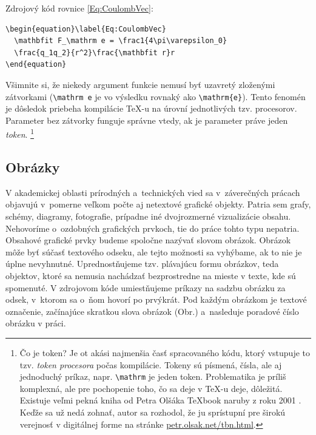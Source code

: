 Zdrojový kód rovnice \eqref{Eq:CoulombVec}:
\begin{verbatim}
\begin{equation}\label{Eq:CoulombVec}
  \mathbfit F_\mathrm e = \frac1{4\pi\varepsilon_0}
  \frac{q_1q_2}{r^2}\frac{\mathbfit r}r
\end{equation}
\end{verbatim}
Všimnite si, že niekedy argument funkcie nemusí byť
uzavretý zloženými zátvorkami (\verb|\mathrm e| je vo výsledku rovnaký ako \verb|\mathrm{e}|).
Tento fenomén je dôsledok priebeha kompilácie \TeX-u na úrovní jednotlivých tzv. procesorov.
Parameter bez zátvorky funguje správne vtedy,
ak je parameter práve jeden \emph{token}.%
\footnote{Čo je token? Je ot akási najmenšia časť spracovaného
kódu, ktorý vstupuje to tzv. \emph{token procesora}
počas kompilácie.
Tokeny sú písmená, čísla, ale aj jednoduchý príkaz, 
napr. \texttt{\textbackslash mathrm} je jeden token. 
Problematika je príliš komplexná, ale pre pochopenie
toho, čo sa deje v \TeX-u deje, dôležitá.
Existuje veľmi pekná kniha od Petra Olšáka \TeX book naruby z roku 2001 \cite{Olsak2001Texbook}.
Keďže sa už nedá zohnať, autor sa rozhodol, že ju sprístupní pre širokú verejnosť v digitálnej forme na stránke 
\href{https://petr.olsak.net/tbn.html}{{petr.olsak.net/tbn.html}}.
}

\subsection{Obrázky}
V akademickej oblasti prírodných a~technických vied sa v~záverečných prácach 
objavujú v~pomerne veľkom počte aj netextové grafické objekty. Patria sem grafy, schémy, diagramy, fotografie,
prípadne iné dvojrozmerné vizualizácie obsahu.
Nehovoríme o~ozdobných grafických prvkoch,
tie do práce tohto typu nepatria.
Obsahové grafické prvky budeme spoločne nazývať slovom obrázok. 
Obrázok môže byť súčasť textového odseku,
ale tejto možnosti sa vyhýbame,
ak to nie je úplne nevyhnutné.
Uprednostňujeme tzv. plávajúcu formu obrázkov,
teda objektov, ktoré sa nemusia nachádzať bezprostredne
na mieste v texte, kde sú spomenuté.
V zdrojovom kóde umiestňujeme príkazy na sadzbu obrázku za odsek,
v~ktorom sa o~ňom hovorí po prvýkrát.
Pod každým obrázkom je textové označenie,
začínajúce skratkou slova obrázok (Obr.) a~nasleduje
poradové číslo obrázku v práci.

